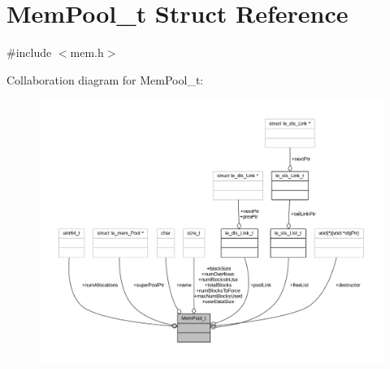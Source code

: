 \hypertarget{struct_mem_pool__t}{}\section{Mem\+Pool\+\_\+t Struct Reference}
\label{struct_mem_pool__t}


{\ttfamily \#include $<$mem.\+h$>$}



Collaboration diagram for Mem\+Pool\+\_\+t\+:
\nopagebreak
\begin{figure}[H]
\begin{center}
\leavevmode
\includegraphics[width=350pt]{struct_mem_pool__t__coll__graph}
\end{center}
\end{figure}
